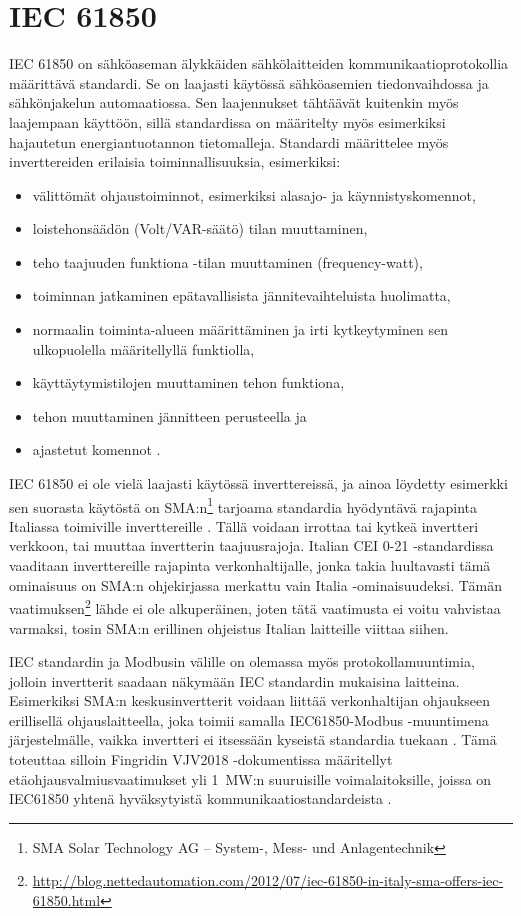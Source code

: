 \section{IEC 61850}
  \gls{IEC} 61850 on sähköaseman älykkäiden sähkölaitteiden kommunikaatioprotokollia määrittävä standardi. Se on laajasti käytössä sähköasemien tiedonvaihdossa ja sähkönjakelun automaatiossa. Sen laajennukset tähtäävät kuitenkin myös laajempaan käyttöön, sillä standardissa on määritelty myös esimerkiksi hajautetun energiantuotannon tietomalleja. Standardi määrittelee myös inverttereiden erilaisia toiminnallisuuksia, esimerkiksi:
    \begin{itemize}
      \item välittömät ohjaustoiminnot, esimerkiksi alasajo- ja käynnistyskomennot,
      \item loistehonsäädön (Volt/VAR-säätö) tilan muuttaminen,
      \item teho taajuuden funktiona -tilan muuttaminen (frequency-watt),
      \item toiminnan jatkaminen epätavallisista jännitevaihteluista huolimatta,
      \item normaalin toiminta-alueen määrittäminen ja irti kytkeytyminen sen ulkopuolella määritellyllä funktiolla,
      \item käyttäytymistilojen muuttaminen tehon funktiona,
      \item tehon muuttaminen jännitteen perusteella ja
      \item ajastetut komennot \parencite{61850funcs}.
    \end{itemize}

  IEC 61850 ei ole vielä laajasti käytössä inverttereissä, ja ainoa löydetty esimerkki sen suorasta käytöstä on SMA:n\footnote{SMA Solar Technology AG -- System-, Mess- und Anlagentechnik} tarjoama standardia hyödyntävä rajapinta Italiassa toimiville inverttereille \parencite{SMAManual}. Tällä voidaan irrottaa tai kytkeä invertteri verkkoon, tai muuttaa invertterin taajuusrajoja. Italian CEI 0-21 -standardissa vaaditaan inverttereille rajapinta verkonhaltijalle, jonka takia luultavasti tämä ominaisuus on SMA:n ohjekirjassa merkattu vain Italia -ominaisuudeksi. Tämän vaatimuksen\footnote{\url{http://blog.nettedautomation.com/2012/07/iec-61850-in-italy-sma-offers-iec-61850.html}} lähde ei ole alkuperäinen, joten tätä vaatimusta ei voitu vahvistaa varmaksi, tosin SMA:n erillinen ohjeistus Italian laitteille viittaa siihen.

  IEC standardin ja Modbusin välille on olemassa myös protokollamuuntimia, jolloin invertterit saadaan näkymään IEC standardin mukaisina laitteina. Esimerkiksi SMA:n keskusinvertterit voidaan liittää verkonhaltijan ohjaukseen erillisellä ohjauslaitteella, joka toimii samalla IEC61850-Modbus -muuntimena järjestelmälle, vaikka invertteri ei itsessään kyseistä standardia tuekaan \parencite{SMAPPManager}. Tämä toteuttaa silloin Fingridin VJV2018 -dokumentissa määritellyt etäohjausvalmiusvaatimukset yli \SI{1}{\mega\watt}:n suuruisille voimalaitoksille, joissa on IEC61850 yhtenä hyväksytyistä kommunikaatiostandardeista \parencite{VJV2018}.


